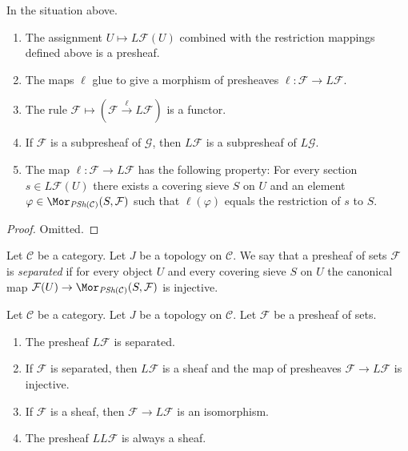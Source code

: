\begin{lemma}
\label{lemma-L-presheaf}
In the situation above.
\begin{enumerate}
\item The assignment $U \mapsto L\mathcal{F}(U)$ combined with the
restriction mappings defined above is a presheaf.
\item The maps $\ell$ glue to give a morphism of presheaves
$\ell : \mathcal{F} \to L\mathcal{F}$.
\item The rule $\mathcal{F} \mapsto (\mathcal{F} \xrightarrow{\ell}
L\mathcal{F})$ is a functor.
\item If $\mathcal{F}$ is a subpresheaf of $\mathcal{G}$, then
$L\mathcal{F}$ is a subpresheaf of $L\mathcal{G}$.
\item The map $\ell : \mathcal{F} \to L\mathcal{F}$ has the
following property: For every section $s \in L\mathcal{F}(U)$
there exists a covering sieve $S$ on $U$ and an element
$\varphi \in \Mor_{\textit{PSh}(\mathcal{C})}(S, \mathcal{F})$
such that $\ell(\varphi)$ equals the restriction of
$s$ to $S$.
\end{enumerate}
\end{lemma}

\begin{proof}
Omitted.
\end{proof}

\begin{definition}
\label{definition-presheaf-separated-topology}
Let $\mathcal{C}$ be a category.
Let $J$ be a topology on $\mathcal{C}$.
We say that a presheaf of sets $\mathcal{F}$
is {\it separated} if for every object $U$ and
every covering sieve $S$ on $U$ the canonical map
$\mathcal{F}(U) \to \Mor_{\textit{PSh}(\mathcal{C})}(S, \mathcal{F})$
is injective.
\end{definition}

\begin{theorem}
\label{theorem-L-topology}
Let $\mathcal{C}$ be a category.
Let $J$ be a topology on $\mathcal{C}$.
Let $\mathcal{F}$ be a presheaf of sets.
\begin{enumerate}
\item The presheaf $L\mathcal{F}$ is separated.
\item If $\mathcal{F}$ is separated, then $L\mathcal{F}$ is a sheaf
and the map of presheaves $\mathcal{F} \to L\mathcal{F}$ is injective.
\item If $\mathcal{F}$ is a sheaf, then $\mathcal{F} \to L\mathcal{F}$
is an isomorphism.
\item The presheaf $LL\mathcal{F}$ is always a sheaf.
\end{enumerate}
\end{theorem}

